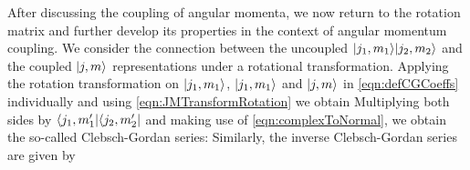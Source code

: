 After discussing the coupling of angular momenta, we now return to the rotation matrix and further develop its 
properties in the context of angular momentum coupling. We consider the connection between the uncoupled 
 $| j_1, m_1 \rangle| j_2, m_2 \rangle$ and the coupled $| j, m \rangle$ representations under a rotational transformation. 
Applying the rotation transformation on $| j_1, m_1 \rangle$, $| j_1, m_1 \rangle$ and $| j, m \rangle$ in \autoref{eqn:defCGCoeffs} individually and using
\autoref{eqn:JMTransformRotation} we obtain
Multiplying both sides by $\langle j_1, m_1^{\prime} |\langle j_2, m_2^{\prime}  |$ and making use of \autoref{eqn:complexToNormal}, we obtain the so-called Clebsch-Gordan 
series:
Similarly, the inverse Clebsch-Gordan series are given by

